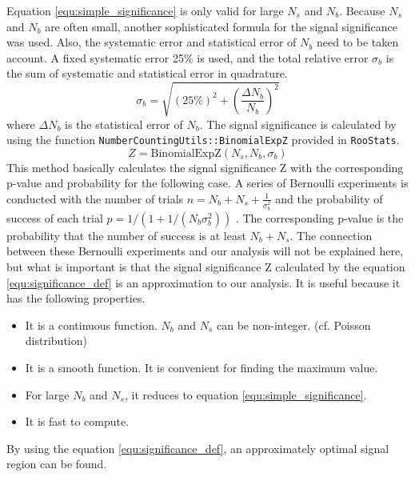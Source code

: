 Equation \ref{equ:simple_significance} is only valid for large $N_s$ and $N_b$.
Because $N_s$ and $N_b$ are often small, another sophisticated formula for the signal significance was used.
Also, the systematic error and statistical error of $N_b$ need to be taken account.
A fixed systematic error 25\% is used, and the total relative error $\sigma_b$ is the sum of systematic and statistical error in quadrature.
\begin{equation}
\sigma_b = \sqrt{(25\%)^2 + (\frac{\Delta N_b}{N_b})^2}
\end{equation}
where $\Delta N_b$ is the statistical error of $N_b$.
The signal significance is calculated by using the function \texttt{NumberCountingUtils::BinomialExpZ} provided in \texttt{RooStats}.
\begin{equation}
Z = \text{BinomialExpZ}(N_s,N_b,\sigma_b)
\label{equ:significance_def}
\end{equation}
This method basically calculates the signal significance Z with the corresponding p-value and probability for the following case.
A series of Bernoulli experiments is conducted with the number of trials $n = N_b + N_s + \frac{1}{\sigma_b ^2}$ and the probability of success of each trial $p = 1/(1 + 1/(N_b \sigma_b ^2))$ \cite{2-leptons-long}.
The corresponding p-value is the probability that the number of success is at least $N_b + N_s$.
The connection between these Bernoulli experiments and our analysis will not be explained here, but what is important is that the signal significance Z calculated by the equation \ref{equ:significance_def} is an approximation to our analysis. It is useful because it has the following properties.
\begin{itemize}
\item It is a continuous function. $N_b$ and $N_s$ can be non-integer. (cf. Poisson distribution)
\item It is a smooth function. It is convenient for finding the maximum value.
\item For large $N_b$ and $N_s$, it reduces to equation \ref{equ:simple_significance}.
\item It is fast to compute.
\end{itemize}
By using the equation \ref{equ:significance_def}, an approximately optimal signal region can be found.

